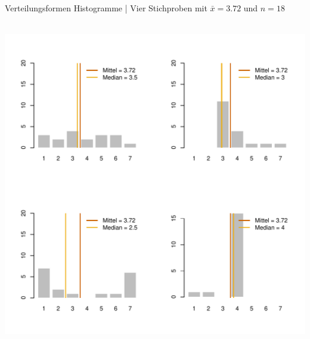 \begin{frame}
  {Verteilungsformen}
  \alert{Histogramme} | Vier Stichproben mit \alert{$\bar{x}=3.72$} und \alert{$n=18$}\\
  \Viertelzeile
  \\
  \begin{center}
    \includegraphics[height=0.75\textheight]{RVorlesung/fourdists}
  \end{center}
\end{frame}

